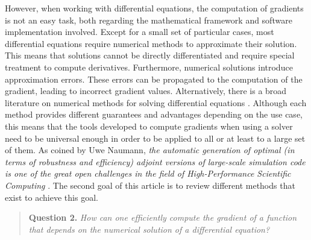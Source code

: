 However, when working with differential equations, the computation of gradients is not an easy task, both regarding the mathematical framework and software implementation involved. 
Except for a small set of particular cases, most differential equations require numerical methods to approximate their solution.
This means that solutions cannot be directly differentiated and require special treatment to compute derivatives. 
Furthermore, numerical solutions introduce approximation errors. 
These errors can be propagated to the computation of the gradient, leading to incorrect gradient values. 
Alternatively, there is a broad literature on numerical methods for solving differential equations \cite{hairer-solving-1, hairer-solving-2}. 
Although each method provides different guarantees and advantages depending on the use case, this means that the tools developed to compute gradients when using a solver need to be universal enough in order to be applied to all or at least to a large set of them. 
As coined by Uwe Naumann, \textit{the automatic generation of optimal (in terms of robustness and efficiency) adjoint versions of large-scale simulation code is one of the great open challenges in the field of High-Performance Scientific Computing} \cite{Naumann.2011}.
The second goal of this article is to review different methods that exist to achieve this goal.
\begin{quote}
    \textbf{Question 2. }
    \textit{How can one efficiently compute the gradient of a function that depends on the numerical solution of a differential equation?}
\end{quote}

